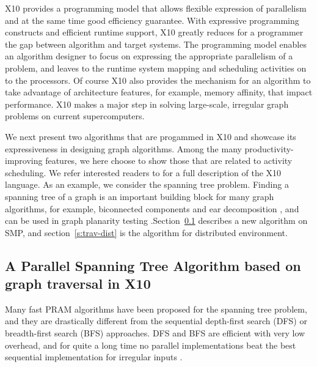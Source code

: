  X10 provides a programming model that allows flexible expression of parallelism and at the same time good efficiency guarantee. With expressive programming constructs and efficient runtime support, X10 greatly reduces for a programmer the gap between algorithm and target systems. The programming model enables an algorithm designer to focus on expressing the appropriate parallelism of a problem, and leaves to the runtime system mapping and scheduling activities on to the processors. Of course X10 also provides the mechanism for an algorithm to take advantage of architecture features, for example, memory affinity, that impact performance. X10 makes a major step in solving large-scale, irregular graph problems on current supercomputers.


 We next present two algorithms that are progammed in X10 and showcase its expressiveness in designing graph algorithms. Among the many productivity-improving features, we here choose to show those that are related to activity scheduling. We refer interested readers to \cite{x10} for a full description of the X10 language.
As an example, we consider the spanning tree problem. Finding a spanning tree of a graph is an important building
block for many graph algorithms, for example, biconnected components
and ear decomposition \cite{MR86}, and can be used in graph planarity
testing \cite{KR88}.Section~\ref{s:trav} describes a new algorithm on SMP, and section~\ref{s:trav-dist} is the algorithm
for distributed environment.


 

\subsection{A Parallel Spanning Tree Algorithm based on graph traversal in X10}
\label{s:trav}

Many fast PRAM algorithms have been proposed for the spanning tree problem, and they 
are drastically different from the sequential depth-first search (DFS) or breadth-first search (BFS) approaches.
DFS and BFS are efficient with very low overhead, and for quite a long time no parallel implementations beat the
best sequential implementation for irregular inputs \cite{BC}. 

